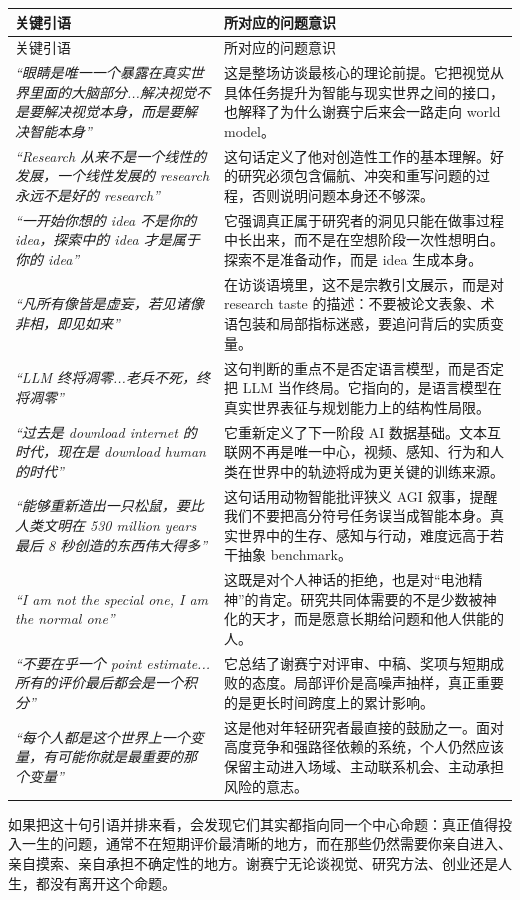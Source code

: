\documentclass[a4paper,12pt]{article}
\begin{document}
\begin{longtable}{>{\raggedright\arraybackslash}p{} >{\raggedright\arraybackslash}p{}}
\toprule
关键引语 & 所对应的问题意识 \\
\midrule
\endfirsthead
\toprule
关键引语 & 所对应的问题意识 \\
\midrule
\endhead
\textit{``眼睛是唯一一个暴露在真实世界里面的大脑部分...解决视觉不是要解决视觉本身，而是要解决智能本身''} & 这是整场访谈最核心的理论前提。它把视觉从具体任务提升为智能与现实世界之间的接口，也解释了为什么谢赛宁后来会一路走向 world model。 \\
\textit{``Research 从来不是一个线性的发展，一个线性发展的 research 永远不是好的 research''} & 这句话定义了他对创造性工作的基本理解。好的研究必须包含偏航、冲突和重写问题的过程，否则说明问题本身还不够深。 \\
\textit{``一开始你想的 idea 不是你的 idea，探索中的 idea 才是属于你的 idea''} & 它强调真正属于研究者的洞见只能在做事过程中长出来，而不是在空想阶段一次性想明白。探索不是准备动作，而是 idea 生成本身。 \\
\textit{``凡所有像皆是虚妄，若见诸像非相，即见如来''} & 在访谈语境里，这不是宗教引文展示，而是对 research taste 的描述：不要被论文表象、术语包装和局部指标迷惑，要追问背后的实质变量。 \\
\textit{``LLM 终将凋零...老兵不死，终将凋零''} & 这句判断的重点不是否定语言模型，而是否定把 LLM 当作终局。它指向的，是语言模型在真实世界表征与规划能力上的结构性局限。 \\
\textit{``过去是 download internet 的时代，现在是 download human 的时代''} & 它重新定义了下一阶段 AI 数据基础。文本互联网不再是唯一中心，视频、感知、行为和人类在世界中的轨迹将成为更关键的训练来源。 \\
\textit{``能够重新造出一只松鼠，要比人类文明在 530 million years 最后 8 秒创造的东西伟大得多''} & 这句话用动物智能批评狭义 AGI 叙事，提醒我们不要把高分符号任务误当成智能本身。真实世界中的生存、感知与行动，难度远高于若干抽象 benchmark。 \\
\textit{``I am not the special one, I am the normal one''} & 这既是对个人神话的拒绝，也是对“电池精神”的肯定。研究共同体需要的不是少数被神化的天才，而是愿意长期给问题和他人供能的人。 \\
\textit{``不要在乎一个 point estimate...所有的评价最后都会是一个积分''} & 它总结了谢赛宁对评审、中稿、奖项与短期成败的态度。局部评价是高噪声抽样，真正重要的是更长时间跨度上的累计影响。 \\
\textit{``每个人都是这个世界上一个变量，有可能你就是最重要的那个变量''} & 这是他对年轻研究者最直接的鼓励之一。面对高度竞争和强路径依赖的系统，个人仍然应该保留主动进入场域、主动联系机会、主动承担风险的意志。 \\
\bottomrule
\end{longtable}

如果把这十句引语并排来看，会发现它们其实都指向同一个中心命题：真正值得投入一生的问题，通常不在短期评价最清晰的地方，而在那些仍然需要你亲自进入、亲自摸索、亲自承担不确定性的地方。谢赛宁无论谈视觉、研究方法、创业还是人生，都没有离开这个命题。
\end{document}
